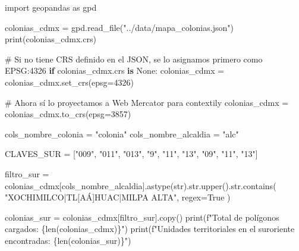 \documentclass[
  spanish,
  letterpaper,
  DIV=11,
  numbers=noendperiod]{scrartcl}
\newenvironment{Shaded}{\begin{snugshade}}{\end{snugshade}}
\newcommand{\BuiltInTok}[1]{\textcolor[rgb]{0.00,0.23,0.31}{#1}}
\newcommand{\CommentTok}[1]{\textcolor[rgb]{0.37,0.37,0.37}{#1}}
\newcommand{\ControlFlowTok}[1]{\textcolor[rgb]{0.00,0.23,0.31}{\textbf{#1}}}
\newcommand{\DecValTok}[1]{\textcolor[rgb]{0.68,0.00,0.00}{#1}}
\newcommand{\ImportTok}[1]{\textcolor[rgb]{0.00,0.46,0.62}{#1}}
\newcommand{\KeywordTok}[1]{\textcolor[rgb]{0.00,0.23,0.31}{\textbf{#1}}}
\newcommand{\NormalTok}[1]{\textcolor[rgb]{0.00,0.23,0.31}{#1}}
\newcommand{\OperatorTok}[1]{\textcolor[rgb]{0.37,0.37,0.37}{#1}}
\newcommand{\SpecialCharTok}[1]{\textcolor[rgb]{0.37,0.37,0.37}{#1}}
\newcommand{\SpecialStringTok}[1]{\textcolor[rgb]{0.13,0.47,0.30}{#1}}
\newcommand{\StringTok}[1]{\textcolor[rgb]{0.13,0.47,0.30}{#1}}
\newcommand{\VariableTok}[1]{\textcolor[rgb]{0.07,0.07,0.07}{#1}}
\begin{document}
\begin{Shaded}
\begin{Highlighting}[]
\ImportTok{import}\NormalTok{ geopandas }\ImportTok{as}\NormalTok{ gpd}

\NormalTok{colonias\_cdmx }\OperatorTok{=}\NormalTok{ gpd.read\_file(}\StringTok{"../data/mapa\_colonias.json"}\NormalTok{)}
\BuiltInTok{print}\NormalTok{(colonias\_cdmx.crs)}

\CommentTok{\# Si no tiene CRS definido en el JSON, se lo asignamos primero como EPSG:4326}
\ControlFlowTok{if}\NormalTok{ colonias\_cdmx.crs }\KeywordTok{is} \VariableTok{None}\NormalTok{:}
\NormalTok{    colonias\_cdmx }\OperatorTok{=}\NormalTok{ colonias\_cdmx.set\_crs(epsg}\OperatorTok{=}\DecValTok{4326}\NormalTok{)}

\CommentTok{\# Ahora sí lo proyectamos a Web Mercator para contextily}
\NormalTok{colonias\_cdmx }\OperatorTok{=}\NormalTok{ colonias\_cdmx.to\_crs(epsg}\OperatorTok{=}\DecValTok{3857}\NormalTok{)}


\NormalTok{cols\_nombre\_colonia }\OperatorTok{=} \StringTok{"colonia"}
\NormalTok{cols\_nombre\_alcaldia }\OperatorTok{=} \StringTok{"alc"}

\NormalTok{CLAVES\_SUR }\OperatorTok{=}\NormalTok{ [}\StringTok{"009"}\NormalTok{, }\StringTok{"011"}\NormalTok{, }\StringTok{"013"}\NormalTok{, }\StringTok{"9"}\NormalTok{, }\StringTok{"11"}\NormalTok{, }\StringTok{"13"}\NormalTok{, }\StringTok{"09"}\NormalTok{, }\StringTok{"11"}\NormalTok{, }\StringTok{"13"}\NormalTok{]}


\NormalTok{filtro\_sur }\OperatorTok{=}\NormalTok{ colonias\_cdmx[cols\_nombre\_alcaldia].astype(}\BuiltInTok{str}\NormalTok{).}\BuiltInTok{str}\NormalTok{.upper().}\BuiltInTok{str}\NormalTok{.contains(}
    \StringTok{"XOCHIMILCO|TL[AÁ]HUAC|MILPA ALTA"}\NormalTok{, regex}\OperatorTok{=}\VariableTok{True}
\NormalTok{)}

\NormalTok{colonias\_sur }\OperatorTok{=}\NormalTok{ colonias\_cdmx[filtro\_sur].copy()}
\BuiltInTok{print}\NormalTok{(}\SpecialStringTok{f"Total de polígonos cargados: }\SpecialCharTok{\{}\BuiltInTok{len}\NormalTok{(colonias\_cdmx)}\SpecialCharTok{\}}\SpecialStringTok{"}\NormalTok{)}
\BuiltInTok{print}\NormalTok{(}\SpecialStringTok{f"Unidades territoriales en el suroriente encontradas: }\SpecialCharTok{\{}\BuiltInTok{len}\NormalTok{(colonias\_sur)}\SpecialCharTok{\}}\SpecialStringTok{"}\NormalTok{)}
\end{Highlighting}
\end{Shaded}
\end{document}

